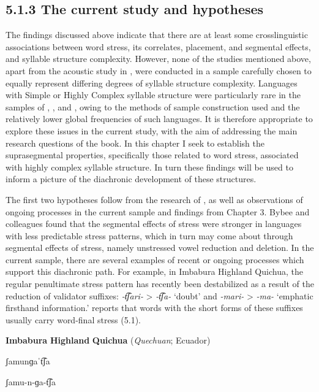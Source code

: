 \subsection{5.1.3 The current study and hypotheses}

  The findings discussed above indicate that there are at least some crosslinguistic associations between word stress, its correlates, placement, and segmental effects, and syllable structure complexity. However, none of the studies mentioned above, apart from the acoustic study in \citet{EasterdayEtAl2011}, were conducted in a sample carefully chosen to equally represent differing degrees of syllable structure complexity. Languages with Simple or Highly Complex syllable structure were particularly rare in the samples of \citet{Auer1993}, \citet{BybeeEtAl1998}, and \citet{Schiering2007}, owing to the methods of sample construction used and the relatively lower global frequencies of such languages. It is therefore appropriate to explore these issues in the current study, with the aim of addressing the main research questions of the book. In this chapter I seek to establish the suprasegmental properties, specifically those related to word stress, associated with highly complex syllable structure. In turn these findings will be used to inform a picture of the diachronic development of these structures.

  The first two hypotheses follow from the research of \citet{BybeeEtAl1998}, as well as observations of ongoing processes in the current sample and findings from Chapter 3. Bybee and colleagues found that the segmental effects of stress were stronger in languages with less predictable stress patterns, which in turn may come about through segmental effects of stress, namely unstressed vowel reduction and deletion. In the current sample, there are several examples of recent or ongoing processes which support this diachronic path. For example, in Imbabura Highland Quichua, the regular penultimate stress pattern has recently been destabilized as a result of the reduction of validator suffixes: \textit{{}-t͡ʃari{}-} > \textit{{}-t͡ʃa{}-} ‘doubt’ and \textit{{}-mari-} > \textit{{}-ma-} ‘emphatic firsthand information.’ \citet{Cole1982} reports that words with the short forms of these suffixes usually carry word-final stress (5.1).

\ea\label{ex:(5.1)}
  \textbf{Imbabura} \textbf{Highland} \textbf{Quichua} (\textit{Quechuan}; Ecuador)

ʃamunɡaˈt͡ʃa

ʃamu{}-n{}-ɡa{}-t͡ʃa


